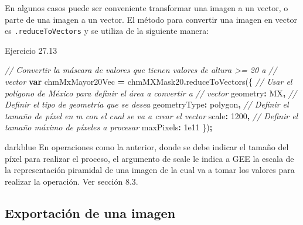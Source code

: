 \documentclass[
  12pt,
  letterpaper,
  twoside]{book}
\newenvironment{Shaded}{\begin{snugshade}}{\end{snugshade}}
\newcommand{\CommentTok}[1]{\textcolor[rgb]{0.56,0.35,0.01}{\textit{#1}}}
\newcommand{\DataTypeTok}[1]{\textcolor[rgb]{0.13,0.29,0.53}{#1}}
\newcommand{\DecValTok}[1]{\textcolor[rgb]{0.00,0.00,0.81}{#1}}
\newcommand{\FloatTok}[1]{\textcolor[rgb]{0.00,0.00,0.81}{#1}}
\newcommand{\FunctionTok}[1]{\textcolor[rgb]{0.00,0.00,0.00}{#1}}
\newcommand{\KeywordTok}[1]{\textcolor[rgb]{0.13,0.29,0.53}{\textbf{#1}}}
\newcommand{\NormalTok}[1]{#1}
\newcommand{\OperatorTok}[1]{\textcolor[rgb]{0.81,0.36,0.00}{\textbf{#1}}}
\newcommand{\StringTok}[1]{\textcolor[rgb]{0.31,0.60,0.02}{#1}}
\begin{document}
En algunos casos puede ser conveniente transformar una imagen a un vector, o parte de una imagen a un vector. El método para convertir una imagen en vector es \texttt{.reduceToVectors} y se utiliza de la siguiente manera:

Ejercicio 27.13

\begin{Shaded}
\begin{Highlighting}[]
\CommentTok{// Convertir la máscara de valores que tienen valores de altura \textgreater{}= 20 a }
\CommentTok{// vector}
\KeywordTok{var}\NormalTok{ chmMxMayor20Vec }\OperatorTok{=}\NormalTok{ chmMXMask20}\OperatorTok{.}\FunctionTok{reduceToVectors}\NormalTok{(\{}
     \CommentTok{// Usar el polígono de México para definir el área a convertir a }
     \CommentTok{// vector}
  \DataTypeTok{geometry}\OperatorTok{:}\NormalTok{ MX}\OperatorTok{,}
\CommentTok{// Definir el tipo de geometría que se desea}
  \DataTypeTok{geometryType}\OperatorTok{:} \StringTok{\textquotesingle{}polygon\textquotesingle{}}\OperatorTok{,}
\CommentTok{// Definir el tamaño de píxel en m con el cual se va a crear el vector}
  \DataTypeTok{scale}\OperatorTok{:} \DecValTok{1200}\OperatorTok{,}
\CommentTok{// Definir el tamaño máximo de píxeles a procesar}
  \DataTypeTok{maxPixels}\OperatorTok{:} \FloatTok{1e11}
\NormalTok{\})}\OperatorTok{;}
\end{Highlighting}
\end{Shaded}

\begin{bluebox2}

\begin{awesomeblock}{5pt}{\faLightbulb}{darkblue}
En operaciones como la anterior, donde se debe indicar el tamaño del píxel para realizar el proceso, el argumento de scale le indica a GEE la escala de la representación piramidal de una imagen de la cual va a tomar los valores para realizar la operación. Ver sección 8.3.

\end{awesomeblock}

\end{bluebox2}

\hypertarget{exportaciuxf3n-de-una-imagen}{%
\subsection*{Exportación de una imagen}\label{exportaciuxf3n-de-una-imagen}}
\end{document}
